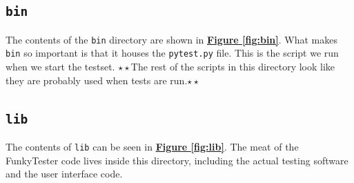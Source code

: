 \documentclass{report}
\newcommand{\dstar}{$\star\star$}	%
\begin{document}
\subsection{\texttt{bin}}
The contents of the \texttt{bin} directory are shown in \hyperref[fig:bin]{\textbf{Figure \ref{fig:bin}}}. What makes \texttt{bin} so important is that it houses the \texttt{pytest.py} file. This is the script we run when we start the testset. \dstar The rest of the scripts in this directory look like they are probably used when tests are run.\dstar\\

	\begin{minipage}{\linewidth}
		\label{fig:bin}
	\end{minipage}

\subsection{\texttt{lib}}
The contents of \texttt{lib} can be seen in \hyperref[fig:lib]{\textbf{Figure \ref{fig:lib}}}. The meat of the FunkyTester code lives inside this directory, including the actual testing software and the user interface code.\\

	\begin{minipage}{\linewidth}
		\label{fig:lib}
	\end{minipage}
	\vspace{5pt}%
\end{document}
